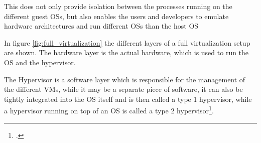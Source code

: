This does not only provide isolation between the processes running on the different \gls{guest} \ac{OS}s,
but also enables the users and developers to emulate hardware architectures and run different \ac{OS}s than the \gls{host} \ac{OS}


In figure \ref{fig:full_virtualization} the different layers of a full virtualization setup are shown.
The hardware layer is the actual hardware, which is used to run the \ac{OS} and the hypervisor.

The Hypervisor is a software layer which is responsible for the management of the different \ac{VM}s,
while it may be a separate piece of software, it can also be tightly integrated into the \ac{OS} itself
and is then called a type 1 hypervisor, while a hypervisor running on top of an \ac{OS} is called a type 2 hypervisor\footcite{awsTypeVsType}.

